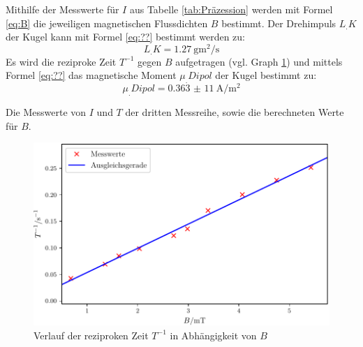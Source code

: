 Mithilfe der Messwerte für $I$ aus Tabelle \ref{tab:Präzession} werden mit Formel \eqref{eq:B} die jeweiligen magnetischen Flussdichten $B$ bestimmt. Der Drehimpuls $L_.K$ der Kugel kann mit Formel \eqref{eq:??} bestimmt werden zu:
\begin{equation*}
L_.K = \SI{1,27}{\gram\metre\squared\per\second}
\end{equation*}
Es wird die reziproke Zeit $T^{-1}$ gegen $B$ aufgetragen (vgl. Graph \ref{fig:Präzession}) und mittels Formel \eqref{eq:??} das magnetische Moment $\mu_.{Dipol}$ der Kugel bestimmt zu:
\begin{equation*}
\mu_.{Dipol} = \SI{0,363(11)}{\ampere\per\metre\squared}
\end{equation*}  
\begin{table}
  	\centering
  	\caption{Die Messwerte von $I$ und $T$ der dritten Messreihe, sowie die berechneten Werte für $B$.}
  	\label{tab:Präzession}
\end{table}
\begin{figure}
	\centering
	\includegraphics[scale = 1,keepaspectratio]
	{content/images/Praezession.pdf}
	\caption{Verlauf der reziproken Zeit $T^{-1}$ in Abhängigkeit von $B$}
	\label{fig:Präzession}
\end{figure}